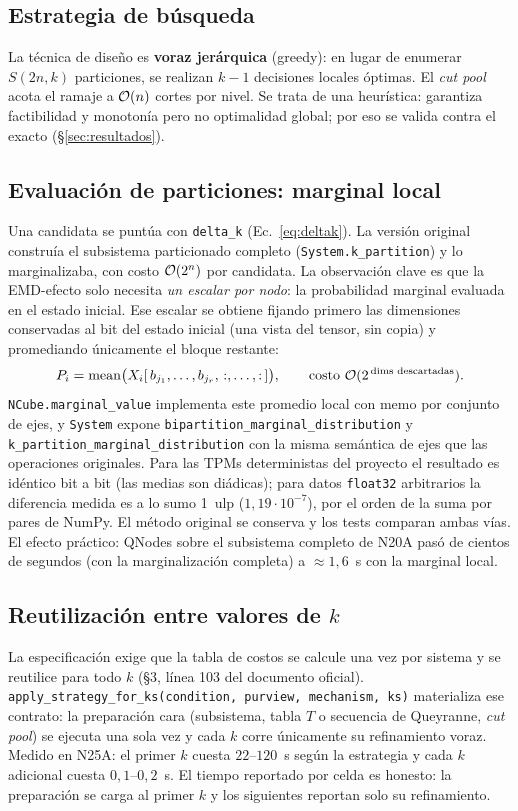 \documentclass[11pt,letterpaper]{article}
\begin{document}
\subsection{Estrategia de búsqueda}
La técnica de diseño es \textbf{voraz jerárquica} (greedy): en lugar de enumerar
$S(2n,k)$ particiones, se realizan $k-1$ decisiones locales óptimas. El
\emph{cut pool} acota el ramaje a $\mathcal{O}(n)$ cortes por nivel. Se trata de una
heurística: garantiza factibilidad y monotonía pero no optimalidad global; por
eso se valida contra el exacto (§\ref{sec:resultados}).

\subsection{Evaluación de particiones: marginal local}
\label{sec:marginal-local}
Una candidata se puntúa con \texttt{delta\_k} (Ec.~\eqref{eq:deltak}). La versión
original construía el subsistema particionado completo
(\texttt{System.k\_partition}) y lo marginalizaba, con costo $\mathcal{O}(2^n)$ por
candidata. La observación clave es que la EMD-efecto solo necesita \emph{un
	escalar por nodo}: la probabilidad marginal evaluada en el estado inicial. Ese
escalar se obtiene fijando primero las dimensiones conservadas al bit del estado
inicial (una vista del tensor, sin copia) y promediando únicamente el bloque
restante:
\[
	P_i = \operatorname{mean}\bigl(X_i[\,b_{j_1},\dots,b_{j_r},\, :,\dots,:\,]\bigr),
	\qquad \text{costo } \mathcal{O}(2^{\,\text{dims descartadas}}).
\]
\texttt{NCube.marginal\_value} implementa este promedio local con memo por
conjunto de ejes, y \texttt{System} expone
\texttt{bipartition\_marginal\_distribution} y
\texttt{k\_partition\_marginal\_distribution} con la misma semántica de ejes que
las operaciones originales. Para las TPMs deterministas del proyecto el
resultado es idéntico bit a bit (las medias son diádicas); para datos
\texttt{float32} arbitrarios la diferencia medida es a lo sumo 1~ulp
($1{,}19\cdot 10^{-7}$), por el orden de la suma por pares de NumPy. El método
original se conserva y los tests comparan ambas vías. El efecto práctico:
QNodes sobre el subsistema completo de N20A pasó de cientos de segundos (con la
marginalización completa) a $\approx 1{,}6$~s con la marginal local.

\subsection{Reutilización entre valores de $k$}
La especificación exige que la tabla de costos se calcule una vez por sistema y
se reutilice para todo $k$ (§3, línea 103 del documento oficial).
\texttt{apply\_strategy\_for\_ks(condition, purview, mechanism, ks)} materializa
ese contrato: la preparación cara (subsistema, tabla $T$ o secuencia de
Queyranne, \emph{cut pool}) se ejecuta una sola vez y cada $k$ corre únicamente
su refinamiento voraz. Medido en N25A: el primer $k$ cuesta $22$--$120$~s según
la estrategia y cada $k$ adicional cuesta $0{,}1$--$0{,}2$~s. El tiempo
reportado por celda es honesto: la preparación se carga al primer $k$ y los
siguientes reportan solo su refinamiento.
\end{document}
